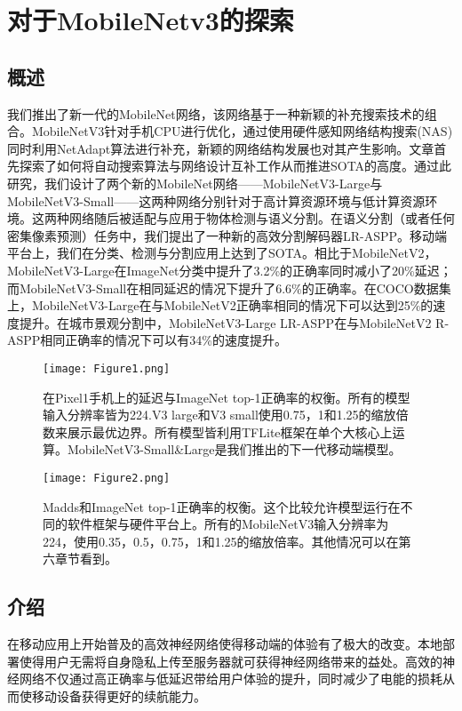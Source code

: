 \section{对于MobileNetv3的探索}

\subsection*{概述}

我们推出了新一代的MobileNet网络，该网络基于一种新颖的补充搜索技术的组合。MobileNetV3针对手机CPU进行优化，通过使用硬件感知网络结构搜索(NAS)同时利用NetAdapt算法进行补充，新颖的网络结构发展也对其产生影响。文章首先探索了如何将自动搜索算法与网络设计互补工作从而推进SOTA的高度。通过此研究，我们设计了两个新的MobileNet网络——MobileNetV3-Large与MobileNetV3-Small——这两种网络分别针对于高计算资源环境与低计算资源环境。这两种网络随后被适配与应用于物体检测与语义分割。在语义分割（或者任何密集像素预测）任务中，我们提出了一种新的高效分割解码器LR-ASPP。移动端平台上，我们在分类、检测与分割应用上达到了SOTA。相比于MobileNetV2，MobileNetV3-Large在ImageNet分类中提升了3.2\%的正确率同时减小了20\%延迟；而MobileNetV3-Small在相同延迟的情况下提升了6.6\%的正确率。在COCO数据集上，MobileNetV3-Large在与MobileNetV2正确率相同的情况下可以达到25\%的速度提升。在城市景观分割中，MobileNetV3-Large LR-ASPP在与MobileNetV2 R-ASPP相同正确率的情况下可以有34\%的速度提升。

\begin{figure}[ht]
    \centering
    \texttt{[image: Figure1.png]}
    \caption{在Pixel1手机上的延迟与ImageNet top-1正确率的权衡。所有的模型输入分辨率皆为224.V3 large和V3 small使用0.75，1和1.25的缩放倍数来展示最优边界。所有模型皆利用TFLite框架在单个大核心上运算。MobileNetV3-Small\&Large是我们推出的下一代移动端模型。}
\end{figure}


\begin{figure}[ht]
    \centering
    \texttt{[image: Figure2.png]}
    \caption{Madds和ImageNet top-1正确率的权衡。这个比较允许模型运行在不同的软件框架与硬件平台上。所有的MobileNetV3输入分辨率为224，使用0.35，0.5，0.75，1和1.25的缩放倍率。其他情况可以在第六章节看到。}
\end{figure}


\subsection{介绍}

在移动应用上开始普及的高效神经网络使得移动端的体验有了极大的改变。本地部署使得用户无需将自身隐私上传至服务器就可获得神经网络带来的益处。高效的神经网络不仅通过高正确率与低延迟带给用户体验的提升，同时减少了电能的损耗从而使移动设备获得更好的续航能力。

